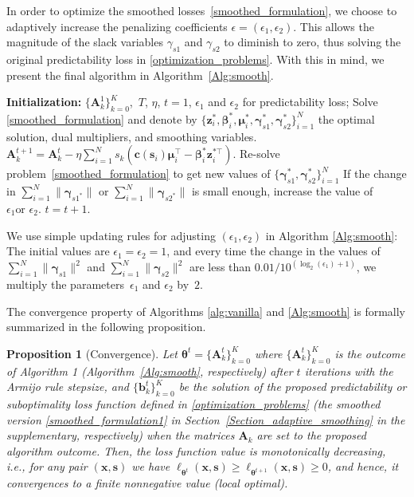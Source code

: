 \documentclass{article}
\def\bgamma{\bm{\gamma}}
\theoremstyle{plain}
\newtheorem{proposition}[theorem]{Proposition}
\begin{document}
In order to optimize the smoothed losses~\eqref{smoothed_formulation}, we choose to adaptively increase the penalizing coefficients $\epsilon = (\epsilon_1,\epsilon_2)$. This allows the magnitude of the slack variables $\gamma_{s1}$ and $\gamma_{s2}$ to diminish to zero, thus solving the original predictability loss in \eqref{optimization_problems}. With this in mind, we present the final algorithm in Algorithm~\ref{Alg:smooth}.
\begin{algorithm}[h!]
\caption{Adaptive smoothing algorithm }\label{Alg:smooth}
\begin{algorithmic}[1]
\STATE \textbf{Initialization: } $\{\bm A^1_k\}_{k = 0}^K$,\, $T$, $\eta$, $t=1$, $\epsilon_1$ and $\epsilon_2$ for predictability loss;
\STATE Solve \eqref{smoothed_formulation} and denote by $\{\bm z_i^*,\bm\beta_i^*,\bm \mu_i^*, \bgamma_{s1}^*, \bgamma_{s2}^*\}_{i=1}^N$ the optimal solution, dual multipliers, and smoothing variables.
\STATE  $\bm A_k^{t+1} = \bm A_k^{t} - \eta\sum_{i=1}^N s_k (\bm c(\bm s_i)\bm \mu_i^\top - \bm \beta_i^*\bm z_i^{*\top}).$
\STATE Re-solve problem~\eqref{smoothed_formulation} to get new values of $\{\bgamma^*_{s1},\bgamma^*_{s2}\}_{i=1}^N$
\STATE If the change in $\sum_{i=1}^N \|\bgamma_{s1^*}\|$ or $\sum_{i=1}^N \|\bgamma_{s2^*}\|$ is small enough, increase the value of $\epsilon_1 \text{or } \epsilon_2$.
\STATE $t=t+1.$
\ENDWHILE
\end{algorithmic}
\end{algorithm}

We use simple updating rules for adjusting $(\epsilon_1, \epsilon_2)$ in Algorithm \ref{Alg:smooth}: The initial values are $\epsilon_1 = \epsilon_2=1$, and every time the change in the values of $\sum_{i=1}^N \|\bgamma_{s1}\|^2$ and $\sum_{i=1}^N \|\bgamma_{s2}\|^2$ are less than $0.01/10^{(\log_2(\epsilon_{1})+1)}$, we multiply the parameters~$\epsilon_{1}$ and $\epsilon_{2}$ by~$2$.

The convergence property of Algorithms \ref{alg:vanilla} and \ref{Alg:smooth} is formally summarized in the following proposition.
 \begin{proposition}[Convergence]  \label{prop_convergence} Let $\bm \theta^t = \{\bm A^t_k\}_{k = 0}^K$  where $\{\bm A^t_k\}_{k = 0}^K$ is the outcome of Algorithm 1 (Algorithm~\ref{Alg:smooth}, respectively) after $t$ iterations with the Armijo rule stepsize, and $\{\bm b^t_k\}_{k = 0}^K$  be the solution of the proposed predictability or suboptimality loss function defined in \eqref{optimization_problems} (the smoothed version \eqref{smoothed_formulation1} in Section~\ref{Section_adaptive_smoothing} in the supplementary, respectively) when the matrices $\bm A_k$  are set to the proposed algorithm outcome. Then, the loss function value is monotonically decreasing, i.e., for any pair $(\bm x, \bm s)$  we have $\ell_{\bm \theta^t}(\bm x, \bm s)\geq \ell_{\bm \theta^{t+1}}(\bm x, \bm s)\geq 0$, and hence, it convergences to a finite nonnegative value (local optimal).
 \end{proposition}
\end{document}
